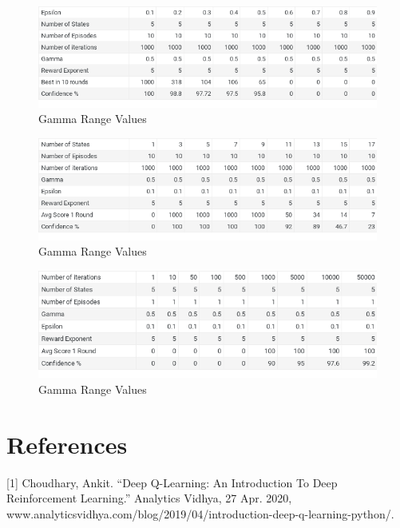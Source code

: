 \documentclass{article}
\begin{document}
\begin{figure}[h!]
    \centering
    \includegraphics[width=1\textwidth]{figure6}
    \caption{Gamma Range Values}
    \label{fig:mesh2}
\end{figure}

\begin{figure}[h!]
    \centering
    \includegraphics[width=1\textwidth]{figure7}
    \caption{Gamma Range Values}
    \label{fig:mesh2}
\end{figure}

\begin{figure}[h!]
    \centering
    \includegraphics[width=1\textwidth]{figure8}
    \caption{Gamma Range Values}
    \label{fig:mesh2}
\end{figure}



\section*{References}

[1] Choudhary, Ankit. “Deep Q-Learning: An Introduction To Deep Reinforcement Learning.” Analytics Vidhya, 27 Apr. 2020, www.analyticsvidhya.com/blog/2019/04/introduction-deep-q-learning-python/.
\end{document}
